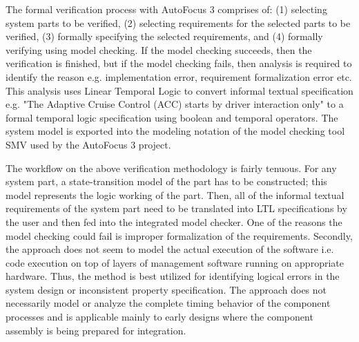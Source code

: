 The formal verification process with AutoFocus 3 comprises of: (1) selecting system parts to be verified, (2) selecting requirements for the selected parts to be verified, (3) formally specifying the selected requirements, and (4) formally verifying using model checking. If the model checking succeeds, then the verification is finished, but if the model checking fails, then analysis is required to identify the reason e.g. implementation error, requirement formalization error etc. This analysis uses Linear Temporal Logic \cite{gabbay1994temporal} to convert informal textual specification e.g. "The Adaptive Cruise Control (ACC) starts by driver interaction only" to a formal temporal logic specification using boolean and temporal operators. The system model is exported into the modeling notation of the model checking tool SMV \cite{mcmillan1993symbolic, mcmillan1999getting} used by the AutoFocus 3 project. 

The workflow on the above verification methodology is fairly tenuous. For any system part, a state-transition model of the part has to be constructed; this model represents the logic working of the part. Then, all of the informal textual requirements of the system part need to be translated into LTL specifications by the user and then fed into the integrated model checker. One of the reasons the model checking could fail is improper formalization of the requirements. Secondly, the approach does not seem to model the actual execution of the software i.e. code execution on top of layers of management software running on appropriate hardware. Thus, the method is best utilized for identifying logical errors in the system design or inconsistent property specification. The approach does not necessarily model or analyze the complete timing behavior of the component processes and is applicable mainly to early designs where the component assembly is being prepared for integration. 

